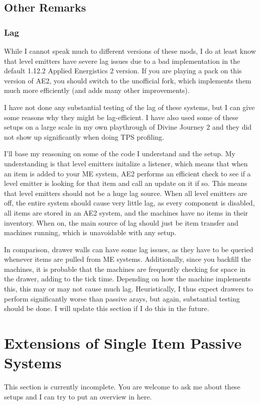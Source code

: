 \documentclass{notes}
\begin{document}
\subsection{Other Remarks}
\subsubsection{Lag}
While I cannot speak much to different versions of these mods, I do at least know that level emitters have severe lag issues due to a bad implementation in the default 1.12.2 Applied Energistics 2 version. If you are playing a pack on this version of AE2, you should switch to the unofficial fork, which implements them much more efficiently (and adds many other improvements).

I have not done any substantial testing of the lag of these systems, but I can give some reasons why they might be lag-efficient. I have also used some of these setups on a large scale in my own playthrough of Divine Journey 2 and they did not show up significantly when doing TPS profiling. 

I'll base my reasoning on some of the code I understand and the setup. My understanding is that level emitters initalize a listener, which means that when an item is added to your ME system, AE2 performs an efficient check to see if a level emitter is looking for that item and call an update on it if so. This means that level emitters should not be a huge lag source. When all level emitters are off, the entire system should cause very little lag, as every component is disabled, all items are stored in an AE2 system, and the machines have no items in their inventory. When on, the main source of lag should just be item transfer and machines running, which is unavoidable with any setup.

In comparison, drawer walls can have some lag issues, as they have to be queried whenever items are pulled from ME systems. Additionally, since you backfill the machines, it is probable that the machines are frequently checking for space in the drawer, adding to the tick time. Depending on how the machine implements this, this may or may not cause much lag. Heuristically, I thus expect drawers to perform significantly worse than passive arays, but again, substantial testing should be done. I will update this section if I do this in the future.

\pagebreak
\section{Extensions of Single Item Passive Systems}
This section is currently incomplete. You are welcome to ask me about these setups and I can try to put an overview in here.
\end{document}
